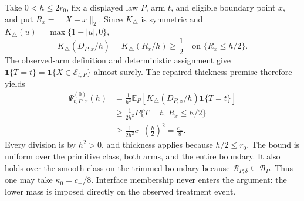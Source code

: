 Take \(0<h\leq2r_0\), fix a displayed law \(P\), arm \(t\), and eligible
boundary point \(x\), and put \(R_x=\lVert X-x\rVert_2\).  Since
\(K_\triangle\) is symmetric and
\(K_\triangle(u)=\max\{1-|u|,0\}\),
\[
 K_\triangle(D_{P,x}/h)=K_\triangle(R_x/h)\geq\frac12
 \quad\text{on }\{R_x\leq h/2\}.
\]
The observed-arm definition and deterministic assignment give
\(\mathbf1\{T=t\}=\mathbf1\{X\in\mathcal E_{t,P}\}\) almost surely.
The repaired thickness premise therefore yields
\[
\begin{aligned}
 \Psi^{(0)}_{t,P,x}(h)
 &=\frac1{h^2}\mathbb E_P\!\left[
 K_\triangle(D_{P,x}/h)\mathbf1\{T=t\}\right]\\
 &\geq\frac1{2h^2}P\{T=t,\ R_x\leq h/2\}\\
 &\geq\frac1{2h^2}c_-\left(\frac h2\right)^2
 =\frac{c_-}{8}.
\end{aligned}
\]
Every division is by \(h^2>0\), and thickness applies because
\(h/2\leq r_0\).  The bound is uniform over the primitive class, both arms,
and the entire boundary.  It also holds over the smooth class on the trimmed
boundary because \(\mathcal B_{P,\delta}\subseteq\mathcal B_P\).  Thus one
may take \(\kappa_0=c_-/8\).  Interface membership never enters the argument:
the lower mass is imposed directly on the observed treatment event.